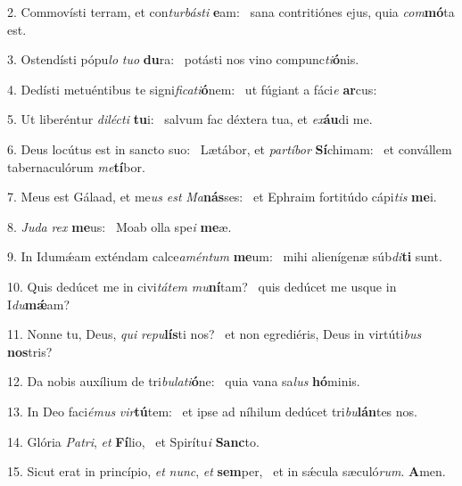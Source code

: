 2. Commovísti terram, et con\textit{tur}\textit{bás}\textit{ti} \textbf{e}am: \ast\  sana contritiónes ejus, quia \textit{com}\textbf{mó}ta est.\

3. Ostendísti pópu\textit{lo} \textit{tu}\textit{o} \textbf{du}ra: \ast\  potásti nos vino compunc\textit{ti}\textbf{ó}nis.\

4. Dedísti metuéntibus te signi\textit{fi}\textit{ca}\textit{ti}\textbf{ó}nem: \ast\  ut fúgiant a fáci\textit{e} \textbf{ar}cus:\

5. Ut liberéntur \textit{di}\textit{léc}\textit{ti} \textbf{tu}i: \ast\  salvum fac déxtera tua, et \textit{ex}\textbf{áu}di me.\

6. Deus locútus est in sancto suo: \dag\  Lætábor, et \textit{par}\textit{tí}\textit{bor} \textbf{Sí}chimam: \ast\  et convállem tabernaculórum \textit{me}\textbf{tí}bor.\

7. Meus est Gálaad, et me\textit{us} \textit{est} \textit{Ma}\textbf{nás}ses: \ast\  et Ephraim fortitúdo cápi\textit{tis} \textbf{me}i.\

8. \textit{Ju}\textit{da} \textit{rex} \textbf{me}us: \ast\  Moab olla spe\textit{i} \textbf{me}æ.\

9. In Idumǽam exténdam calce\textit{a}\textit{mén}\textit{tum} \textbf{me}um: \ast\  mihi alienígenæ súb\textit{di}\textbf{ti} sunt.\

10. Quis dedúcet me in civi\textit{tá}\textit{tem} \textit{mu}\textbf{ní}tam? \ast\  quis dedúcet me usque in I\textit{du}\textbf{mǽ}am?\

11. Nonne tu, Deus, \textit{qui} \textit{re}\textit{pu}\textbf{lís}ti nos? \ast\  et non egrediéris, Deus in virtúti\textit{bus} \textbf{nos}tris?\

12. Da nobis auxílium de tri\textit{bu}\textit{la}\textit{ti}\textbf{ó}ne: \ast\  quia vana sa\textit{lus} \textbf{hó}minis.\

13. In Deo faci\textit{é}\textit{mus} \textit{vir}\textbf{tú}tem: \ast\  et ipse ad níhilum dedúcet tri\textit{bu}\textbf{lán}tes nos.\

14. Glória \textit{Pa}\textit{tri}, \textit{et} \textbf{Fí}lio, \ast\  et Spirítu\textit{i} \textbf{Sanc}to.\

15. Sicut erat in princípio, \textit{et} \textit{nunc}, \textit{et} \textbf{sem}per, \ast\  et in sǽcula sæculó\textit{rum}. \textbf{A}men.\

